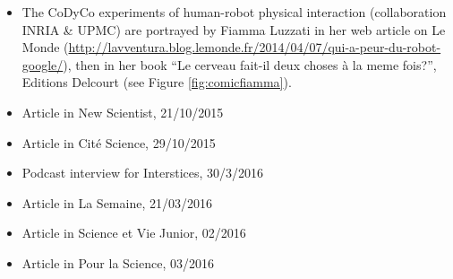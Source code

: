\begin{itemize}

\item The CoDyCo experiments of human-robot physical interaction (collaboration INRIA \& UPMC) are portrayed by Fiamma Luzzati in her web article on Le Monde (\url{http://lavventura.blog.lemonde.fr/2014/04/07/qui-a-peur-du-robot-google/}), then in her book ``Le cerveau fait-il deux choses \`a la meme fois?'', Editions Delcourt (see Figure \ref{fig:comicfiamma}).
\item Article in New Scientist, 21/10/2015 %
\item Article in Cit\'e Science, 29/10/2015
\item Podcast interview for Interstices, 30/3/2016
\item Article in La Semaine, 21/03/2016 
\item Article in Science et Vie Junior, 02/2016
\item Article in Pour la Science, 03/2016 

\end{itemize}
